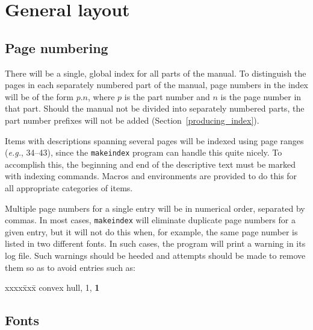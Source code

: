 \documentclass[11pt]{article}
\newenvironment{indexex}{\begin{tabbing}
xxxx\=xxx\=\kill}{\end{tabbing}}
\begin{document}

\section{General layout}
\label{layout}

\subsection{Page numbering}%
\label{page_numbering}

There will be a single, global index for all parts of the manual.
To distinguish the pages in each separately numbered part of the manual,
page numbers in the index will be of the form $p.n$, where $p$ is the part 
number and $n$ is the page number in that part.  Should 
the manual not
be divided into separately numbered parts, the part number prefixes will 
not be added (Section~\ref{producing_index}).

Items with descriptions spanning several pages will be indexed using page 
ranges ({\it e.g.}, 34--43), since the {\tt makeindex} program can handle 
this quite nicely.
To accomplish this, the beginning and end of the descriptive
text must be marked with indexing commands.  Macros and environments
are provided to do this for all appropriate categories of items.

Multiple page numbers for a single entry will be in numerical order, separated
by commas.   In most cases, {\tt makeindex} will eliminate duplicate page
numbers for a given entry, but it will not do this when, for example,
the same page number is listed in two different fonts.  In such cases,
the program will print a warning in its log file. Such warnings should
be heeded and attempts should be made to remove them so as to avoid
entries such as:
\begin{indexex}
convex hull,   1, {\bf 1}
\end{indexex}%


\subsection{Fonts}%
\label{fonts}
\end{document}
